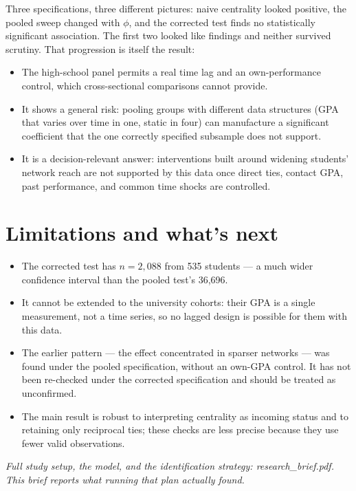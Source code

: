 \documentclass[11pt]{article}
\begin{document}
Three specifications, three different pictures: naive centrality looked positive,
the pooled sweep changed with $\phi$, and the corrected test finds no statistically
significant association. The first two looked like findings and neither survived
scrutiny. That progression is itself the result:
\begin{itemize}
  \item The high-school panel permits a real time lag and an own-performance control,
        which cross-sectional comparisons cannot provide.
  \item It shows a general risk: pooling groups with different data structures (GPA
        that varies over time in one, static in four) can manufacture a significant
        coefficient that the one correctly specified subsample does not support.
  \item It is a decision-relevant answer: interventions built around widening
        students' network reach are not supported by this data once direct ties,
        contact GPA, past performance, and common time shocks are controlled.
\end{itemize}

\section*{Limitations and what's next}

\begin{itemize}
  \item The corrected test has $n=2{,}088$ from 535 students --- a much wider
        confidence interval than the pooled test's 36,696.
  \item It cannot be extended to the university cohorts: their GPA is a single
        measurement, not a time series, so no lagged design is possible for them with
        this data.
  \item The earlier pattern --- the effect concentrated in sparser networks --- was
        found under the pooled specification, without an own-GPA control. It has not
        been re-checked under the corrected specification and should be treated as
        unconfirmed.
  \item The main result is robust to interpreting centrality as incoming status and
        to retaining only reciprocal ties; these checks are less precise because they
        use fewer valid observations.
\end{itemize}

\vspace{1em}
\noindent\textit{Full study setup, the model, and the identification strategy:
research\_brief.pdf. This brief reports what running that plan actually found.}
\end{document}
